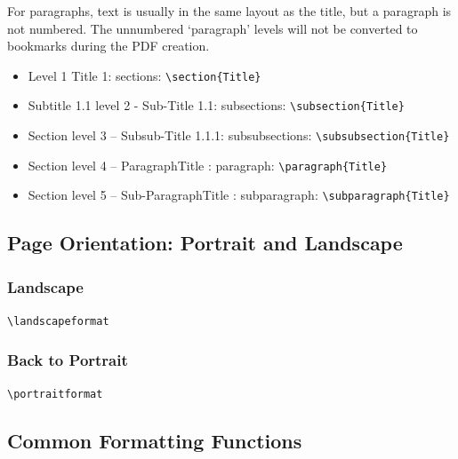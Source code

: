 \documentclass{pharmrep}
\begin{document}
For paragraphs, text is usually in the same layout as the title, but a paragraph is not numbered. The
unnumbered `paragraph' levels will not be converted to bookmarks during the PDF creation.
\begin{itemize}
   \item Level 1 Title 1: sections: \verb|\section{Title}|
   \item Subtitle 1.1 level 2 - Sub-Title 1.1: subsections: \verb|\subsection{Title}|
   \item Section level 3 -- Subsub-Title 1.1.1: subsubsections: \verb|\subsubsection{Title}|
   \item Section level 4 -- ParagraphTitle : paragraph: \verb|\paragraph{Title}|
   \item Section level 5 -- Sub-ParagraphTitle : subparagraph: \verb|\subparagraph{Title}|
\end{itemize}

\subsection{Page Orientation: Portrait and Landscape}
\blindtext

\landscapeformat
\subsubsection{Landscape}
\verb|\landscapeformat|

\blindtext

\blindtext

\portraitformat
\subsubsection{Back to Portrait}
\verb|\portraitformat|

\blindtext

\subsection{Common Formatting Functions}
\end{document}
